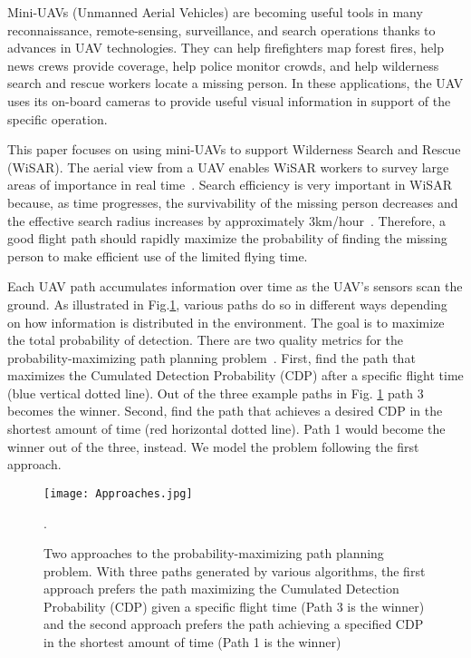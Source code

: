 
Mini-UAVs (Unmanned Aerial Vehicles) are becoming useful tools in many reconnaissance, remote-sensing, surveillance, and search operations thanks to advances in UAV technologies. They can help firefighters map forest fires, help news crews provide coverage, help police monitor crowds, and help wilderness search and rescue workers locate a missing person. In these applications, the UAV uses its on-board cameras to provide useful visual information in support of the specific operation.

This paper focuses on using mini-UAVs to support Wilderness Search and Rescue (WiSAR). The aerial view from a UAV enables WiSAR workers to survey large areas of importance in real time~\cite{Goodrich2008Supporting}. Search efficiency is very important in WiSAR because, as time progresses, the survivability of the missing person decreases and the effective search radius increases by approximately 3km/hour~\cite{Syrotuck2000Introduction}. Therefore, a good flight path should rapidly maximize the probability of finding the missing person to make efficient use of the limited flying time.

Each UAV path accumulates information over time as the UAV's sensors scan the ground. As illustrated in Fig.\ref{TwoApproaches}, various paths do so in different ways depending on how information is distributed in the environment. The goal is to maximize the total probability of detection. There are two quality metrics for the probability-maximizing path planning problem~\cite{Koopman1957Theory, Stone1975Theory, Washburn1981Search}. First, find the path that maximizes the Cumulated Detection Probability (CDP) after a specific flight time (blue vertical dotted line). Out of the three example paths in Fig.
\ref{TwoApproaches} path 3 becomes the winner. Second, find the path that achieves a desired CDP in the shortest amount of time (red horizontal dotted line). Path 1 would become the winner out of the three, instead. We model the problem following the first approach.
\begin{figure}
\centering
\texttt{[image: Approaches.jpg]}
\caption{Two approaches to the probability-maximizing path planning problem. With three paths generated by various algorithms, the first approach prefers the path maximizing the Cumulated Detection Probability (CDP) given a specific flight time (Path 3 is the winner) and the second approach prefers the path achieving a specified CDP in the shortest amount of time (Path 1 is the winner)}. 
\label{TwoApproaches}
\end{figure}


